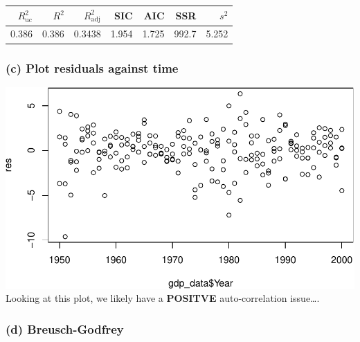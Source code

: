 \documentclass[11pt,]{article}
\newenvironment{Shaded}{\begin{snugshade}}{\end{snugshade}}
\newcommand{\KeywordTok}[1]{\textcolor[rgb]{0.13,0.29,0.53}{\textbf{#1}}}
\newcommand{\DecValTok}[1]{\textcolor[rgb]{0.00,0.00,0.81}{#1}}
\newcommand{\StringTok}[1]{\textcolor[rgb]{0.31,0.60,0.02}{#1}}
\newcommand{\OperatorTok}[1]{\textcolor[rgb]{0.81,0.36,0.00}{\textbf{#1}}}
\newcommand{\NormalTok}[1]{#1}
\begin{document}
\begin{Shaded}
\end{Shaded}

\begin{longtable}[]{@{}rrrrrrr@{}}
\toprule
\(R^2_\text{uc}\) & \(R^2\) & \(R^2_\text{adj}\) & SIC & AIC & SSR &
\(s^2\)\tabularnewline
\midrule
\endhead
0.386 & 0.386 & 0.3438 & 1.954 & 1.725 & 992.7 & 5.252\tabularnewline
\bottomrule
\end{longtable}

\subsubsection{(c) Plot residuals against
time}\label{c-plot-residuals-against-time}

\begin{Shaded}
\end{Shaded}

\includegraphics{ps4_code_files/figure-latex/plot_resid-1.pdf} Looking
at this plot, we likely have a \textbf{POSITVE} auto-correlation
issue\ldots{}.

\subsubsection{(d) Breusch-Godfrey}\label{d-breusch-godfrey}
\end{document}
